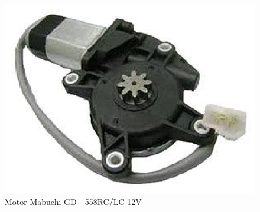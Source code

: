 \begin{itemize}
       \begin{figure}[!htbp]
       	\begin{center}
       		\includegraphics[keepaspectratio=true,scale=1]{figuras/mabuchi.eps}
       		\caption{Motor Mabuchi GD - 558RC/LC 12V}
       	\end{center}
       \end{figure}


\end{itemize}
